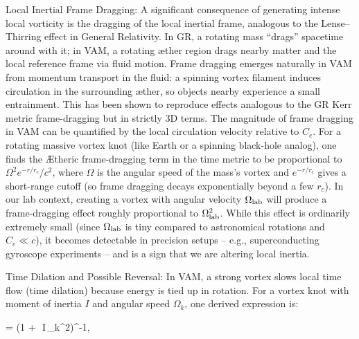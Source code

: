 Local Inertial Frame Dragging: A significant consequence of generating intense local vorticity is the dragging of the local inertial frame, analogous to the Lense–Thirring effect in General Relativity. In GR, a rotating mass “drags” spacetime around with it; in VAM, a rotating æther region drags nearby matter and the local reference frame via fluid motion. Frame dragging emerges naturally in VAM from momentum transport in the fluid: a spinning vortex filament induces circulation in the surrounding æther, so objects nearby experience a small entrainment. This has been shown to reproduce effects analogous to the GR Kerr metric frame-dragging but in strictly 3D terms. The magnitude of frame dragging in VAM can be quantified by the local circulation velocity relative to $C_e$. For a rotating massive vortex knot (like Earth or a spinning black-hole analog), one finds the Ætheric frame-dragging term in the time metric to be proportional to $\Omega^2 e^{-r/r_c}/c^2$, where $\Omega$ is the angular speed of the mass’s vortex and $e^{-r/r_c}$ gives a short-range cutoff (so frame dragging decays exponentially beyond a few $r_c$). In our lab context, creating a vortex with angular velocity $\Omega_{\rm lab}$ will produce a frame-dragging effect roughly proportional to $\Omega_{\rm lab}^2$. While this effect is ordinarily extremely small (since $\Omega_{\rm lab}$ is tiny compared to astronomical rotations and $C_e \ll c$), it becomes detectable in precision setups – e.g., superconducting gyroscope experiments – and is a sign that we are altering local inertia.


Time Dilation and Possible Reversal: In VAM, a strong vortex slows local time flow (time dilation) because energy is tied up in rotation. For a vortex knot with moment of inertia $I$ and angular speed $\Omega_k$, one derived expression is:


 \;=\; \Big(1 + \,\beta\,I\,\Omega_k^2\Big)^{-1}, \label{eq:timedil}


